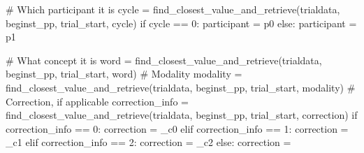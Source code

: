 \documentclass[
  letterpaper,
  DIV=11,
  numbers=noendperiod]{scrreprt}
\newenvironment{Shaded}{\begin{snugshade}}{\end{snugshade}}
\newcommand{\CommentTok}[1]{\textcolor[rgb]{0.37,0.37,0.37}{#1}}
\newcommand{\ControlFlowTok}[1]{\textcolor[rgb]{0.00,0.23,0.31}{#1}}
\newcommand{\DecValTok}[1]{\textcolor[rgb]{0.68,0.00,0.00}{#1}}
\newcommand{\NormalTok}[1]{\textcolor[rgb]{0.00,0.23,0.31}{#1}}
\newcommand{\OperatorTok}[1]{\textcolor[rgb]{0.37,0.37,0.37}{#1}}
\newcommand{\StringTok}[1]{\textcolor[rgb]{0.13,0.47,0.30}{#1}}
\begin{document}
\begin{Shaded}
\begin{Highlighting}[]
                \CommentTok{\# Which participant it is}
\NormalTok{                cycle }\OperatorTok{=}\NormalTok{ find\_closest\_value\_and\_retrieve(trialdata, beginst\_pp, }\StringTok{\textquotesingle{}trial\_start\textquotesingle{}}\NormalTok{, }\StringTok{\textquotesingle{}cycle\textquotesingle{}}\NormalTok{)}
                \ControlFlowTok{if}\NormalTok{ cycle }\OperatorTok{==} \DecValTok{0}\NormalTok{:}
\NormalTok{                    participant }\OperatorTok{=} \StringTok{\textquotesingle{}p0\textquotesingle{}}
                \ControlFlowTok{else}\NormalTok{:}
\NormalTok{                    participant }\OperatorTok{=} \StringTok{\textquotesingle{}p1\textquotesingle{}}

                \CommentTok{\# What concept it is}
\NormalTok{                word }\OperatorTok{=}\NormalTok{ find\_closest\_value\_and\_retrieve(trialdata, beginst\_pp, }\StringTok{\textquotesingle{}trial\_start\textquotesingle{}}\NormalTok{, }\StringTok{\textquotesingle{}word\textquotesingle{}}\NormalTok{)}
                \CommentTok{\# Modality}
\NormalTok{                modality }\OperatorTok{=}\NormalTok{ find\_closest\_value\_and\_retrieve(trialdata, beginst\_pp, }\StringTok{\textquotesingle{}trial\_start\textquotesingle{}}\NormalTok{, }\StringTok{\textquotesingle{}modality\textquotesingle{}}\NormalTok{)}
                \CommentTok{\# Correction, if applicable}
\NormalTok{                correction\_info }\OperatorTok{=}\NormalTok{ find\_closest\_value\_and\_retrieve(trialdata, beginst\_pp, }\StringTok{\textquotesingle{}trial\_start\textquotesingle{}}\NormalTok{, }\StringTok{\textquotesingle{}correction\textquotesingle{}}\NormalTok{)}
                \ControlFlowTok{if}\NormalTok{ correction\_info }\OperatorTok{==} \DecValTok{0}\NormalTok{:}
\NormalTok{                    correction }\OperatorTok{=} \StringTok{\textquotesingle{}\_c0\textquotesingle{}}
                \ControlFlowTok{elif}\NormalTok{ correction\_info }\OperatorTok{==} \DecValTok{1}\NormalTok{:}
\NormalTok{                    correction }\OperatorTok{=} \StringTok{\textquotesingle{}\_c1\textquotesingle{}}
                \ControlFlowTok{elif}\NormalTok{ correction\_info }\OperatorTok{==} \DecValTok{2}\NormalTok{:}
\NormalTok{                    correction }\OperatorTok{=} \StringTok{\textquotesingle{}\_c2\textquotesingle{}}
                \ControlFlowTok{else}\NormalTok{:}
\NormalTok{                    correction }\OperatorTok{=} \StringTok{\textquotesingle{}\textquotesingle{}}
                

\end{Highlighting}
\end{Shaded}
\end{document}
